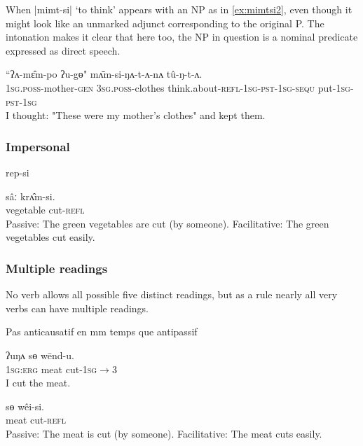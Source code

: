 \documentclass[twoside,a4paper,11pt]{article}
\newcommand{\ipa}[1]{{\phon#1}}
\begin{document}
When |\ipa{mimt-si}| `to think' appears with an NP as in  \ref{ex:mimtsi2}, even though it might look like an unmarked adjunct corresponding to the original P. The intonation makes it clear that here too, the NP in question is a nominal predicate expressed as direct speech.

\begin{exe}
\ex \label{ex:mimtsi2}
\gll 
``\ipa{ʔʌ-mɛ̂m-po} 	\ipa{ʔu-gɵ}" 	\ipa{mʌ̄m-si-ŋʌ-t-ʌ-nʌ} 	\ipa{tû-ŋ-t-ʌ.}
 \\
 \textsc{1sg.poss}-mother-\textsc{gen} \textsc{3sg.poss}-clothes think.about-\textsc{refl-1sg-pst-1sg-sequ} put-\textsc{1sg-pst-1sg} \\
\glt I thought: "These were my mother's clothes" and kept them.
\end{exe}
 
 
 
   \subsubsection{Impersonal} 
   
   rep-si
   
   \begin{exe}
\ex \label{ex:kriptsi} 
\gll 
 \ipa{sâː}  	\ipa{krʌ̂m-si.}  \\
 vegetable cut-\textsc{refl} \\
\glt Passive: The green vegetables are cut (by someone).
\glt Facilitative: The green vegetables cut easily.
\end{exe}
 
 
 \subsubsection{Multiple readings}  
No verb allows all possible five distinct readings, but as a rule nearly all very verbs can have multiple readings. 

Pas anticausatif en mm temps que antipassif



\begin{exe}
\ex \label{ex:wendu} 
\gll 
\ipa{ʔuŋʌ}  	\ipa{sɵ}  	\ipa{wēnd-u.}  \\
\textsc{1sg:erg} meat cut-\textsc{1sg$\rightarrow$3} \\
\glt I cut the meat.
\end{exe}

\begin{exe}
\ex \label{ex:weisi} 
\gll 
 \ipa{sɵ}  	\ipa{wêi-si.}  \\
 meat cut-\textsc{refl} \\
\glt Passive: The meat is cut (by someone).
\glt Facilitative: The meat cuts easily.
\end{exe}
\end{document}
